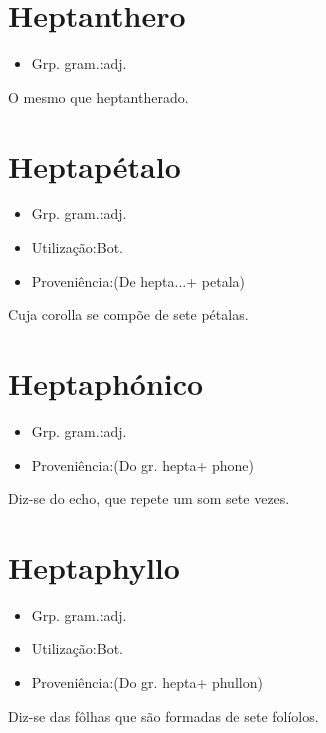 \documentclass{article}
\begin{document}
\section{Heptanthero}
\begin{itemize}
\item {Grp. gram.:adj.}
\end{itemize}
O mesmo que \textunderscore heptantherado\textunderscore .
\section{Heptapétalo}
\begin{itemize}
\item {Grp. gram.:adj.}
\end{itemize}
\begin{itemize}
\item {Utilização:Bot.}
\end{itemize}
\begin{itemize}
\item {Proveniência:(De \textunderscore hepta...\textunderscore  + \textunderscore petala\textunderscore )}
\end{itemize}
Cuja corolla se compõe de sete pétalas.
\section{Heptaphónico}
\begin{itemize}
\item {Grp. gram.:adj.}
\end{itemize}
\begin{itemize}
\item {Proveniência:(Do gr. \textunderscore hepta\textunderscore  + \textunderscore phone\textunderscore )}
\end{itemize}
Diz-se do echo, que repete um som sete vezes.
\section{Heptaphyllo}
\begin{itemize}
\item {Grp. gram.:adj.}
\end{itemize}
\begin{itemize}
\item {Utilização:Bot.}
\end{itemize}
\begin{itemize}
\item {Proveniência:(Do gr. \textunderscore hepta\textunderscore  + \textunderscore phullon\textunderscore )}
\end{itemize}
Diz-se das fôlhas que são formadas de sete folíolos.
\end{document}
